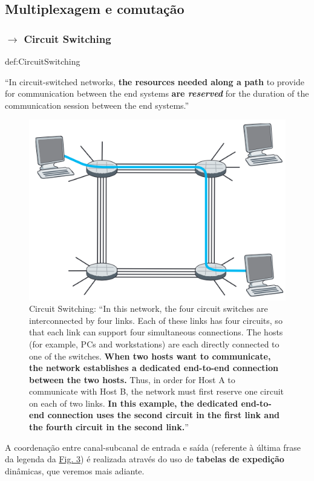 \clearpage
\subsection[1.2 Multiplexagem e comutação]{\hspace*{0.075 em}\raisebox{0.2 em}{$\pmb{\drsh}$} Multiplexagem e comutação}
\label{subsec:multiplexagem-e-comutação}


\subsubsection[1.2.1 Circuit Switching]{$\pmb{\rightarrow}$ Circuit Switching}

\begin{theo}{def:CircuitSwitching}\label{def:CircuitSwitching}

    ``In circuit-switched networks, \textbf{the resources needed along a path} to provide for communication between the end systems \textbf{are \textit{reserved}} for the duration of the communication session between the end systems.''\cite{Kurose2017}
\end{theo}

\begin{figure}[H]
    \centering
    \includegraphics[width = 0.7\linewidth]{img/1/circuit-switching.png}
    \caption{Circuit Switching: ``In this network, the four circuit switches are interconnected by four links. Each of these links has four circuits, so that each link can support four simultaneous connections. The hosts (for example, PCs and workstations) are each directly connected to one of the switches. \textbf{When two hosts want to communicate, the network establishes a dedicated end-to-end connection between the two hosts.} Thus, in order for Host A to communicate with Host B, the network must first reserve one circuit on each of two links. \textbf{In this example, the dedicated end-to-end connection uses the second circuit in the first link and the fourth circuit in the second link.}''\cite{Kurose2017}}
    \label{fig:circuitswitching}
\end{figure}
\noindent A coordenação entre canal-subcanal de entrada e saída (referente à última frase da legenda da \hyperref[fig:circuitswitching]{Fig. 3}) é realizada através do uso de \textbf{tabelas de expedição} dinâmicas, que veremos mais adiante. 

